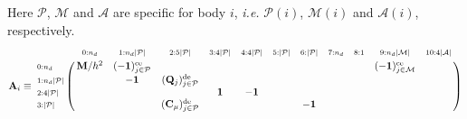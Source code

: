\documentclass[a4paper,10pt]{article}
\begin{document}
Here $\mathcal{P}$, $\mathcal{M}$ and $\mathcal{A}$ are specific for body $i$,
\emph{i.e.} $\mathcal{P}(i)$, $\mathcal{M}(i)$ and $\mathcal{A}(i)$, respectively.
\begin{equation}\notag
\mathbf{A}_i \equiv
\bordermatrix{
                                    &    \scriptstyle{0 : n_d}                      &              \scriptstyle{1 : n_d |\mathcal{P}|}          &        \scriptstyle{2 : 5 |\mathcal{P}|}       &  \scriptstyle{3 : 4 |\mathcal{P}|}   & \scriptstyle{4 : 4|\mathcal{P}|}    &   \scriptstyle{5 : |\mathcal{P}| }  & \scriptstyle{6 : |\mathcal{P}| }  & \scriptstyle{7 : n_d}  &   \scriptstyle{8 : 1 } & \scriptstyle{9 : n_d |\mathcal{M}| }             & \scriptstyle{10: 4 |\mathcal{A}| }               \cr
\scriptstyle{0:n_d}                 &  \mathbf{M}/h^2                               & (-\mathbf{1})_{j \in \mathcal{P}}^\text{ce}               &                                                &                                      &                                     &                                     &                                   &                        &                        & (-\mathbf{1})_{j \in \mathcal{M}}^\text{ce}      &                                                  \cr
\scriptstyle{1:n_d |\mathcal{P}|}   &                                               &  -\mathbf{1}                                              &  (\mathbf{Q}_j)_{j \in \mathcal{P}}^\text{de}  &                                      &                                     &                                     &                                   &                        &                        &                                                  &                                                  \cr
\scriptstyle{2:4 |\mathcal{P}|}     &                                               &                                                           &                                                &  \mathbf{1}                          &  -\mathbf{1}                        &                                     &                                   &                        &                        &                                                  &                                                  \cr
\scriptstyle{3:  |\mathcal{P}|}     &                                               &                                                           &(\mathbf{C}_\mu)_{j \in \mathcal{P}}^\text{de}  &                                      &                                     &                                     & -\mathbf{1}                       &                        &                        &                                                  &                                                  \cr
}
\end{equation}
\end{document}
